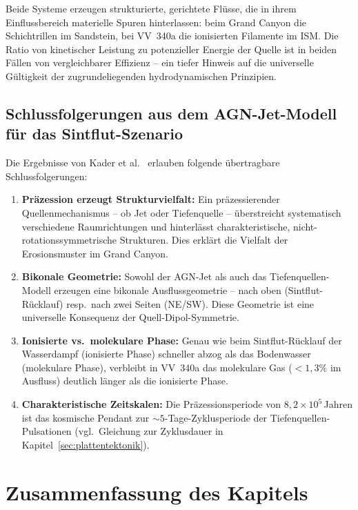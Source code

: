 ﻿\documentclass[12pt,a4paper]{report}
\begin{document}
Beide Systeme erzeugen strukturierte, gerichtete Flüsse, die in ihrem Einflussbereich materielle Spuren hinterlassen: beim Grand Canyon die Schichtrillen im Sandstein, bei VV~340a die ionisierten Filamente im ISM. Die Ratio von kinetischer Leistung zu potenzieller Energie der Quelle ist in beiden Fällen von vergleichbarer Effizienz -- ein tiefer Hinweis auf die universelle Gültigkeit der zugrundeliegenden hydrodynamischen Prinzipien.

\subsection{Schlussfolgerungen aus dem AGN-Jet-Modell für das Sintflut-Szenario}

Die Ergebnisse von Kader et al.\ \cite{kader2026} erlauben folgende übertragbare Schlussfolgerungen:

\begin{enumerate}
	\item \textbf{Präzession erzeugt Strukturvielfalt:} Ein präzessierender Quellenmechanismus -- ob Jet oder Tiefenquelle -- überstreicht systematisch verschiedene Raumrichtungen und hinterlässt charakteristische, nicht-rotationssymmetrische Strukturen. Dies erklärt die Vielfalt der Erosionsmuster im Grand Canyon.
	
	\item \textbf{Bikonale Geometrie:} Sowohl der AGN-Jet als auch das Tiefenquellen-Modell erzeugen eine bikonale Ausflussgeometrie -- nach oben (Sintflut-Rücklauf) resp.\ nach zwei Seiten (NE/SW). Diese Geometrie ist eine universelle Konsequenz der Quell-Dipol-Symmetrie.
	
	\item \textbf{Ionisierte vs.\ molekulare Phase:} Genau wie beim Sintflut-Rücklauf der Wasserdampf (ionisierte Phase) schneller abzog als das Bodenwasser (molekulare Phase), verbleibt in VV~340a das molekulare Gas ($<1{,}3\%$ im Ausfluss) deutlich länger als die ionisierte Phase.
	
	\item \textbf{Charakteristische Zeitskalen:} Die Präzessionsperiode von $8{,}2 \times 10^5$\,Jahren ist das kosmische Pendant zur $\sim 5$-Tage-Zyklusperiode der Tiefenquellen-Pulsationen (vgl.\ Gleichung zur Zyklusdauer in Kapitel~\ref{sec:plattentektonik}).
\end{enumerate}

\section{Zusammenfassung des Kapitels}
\end{document}

